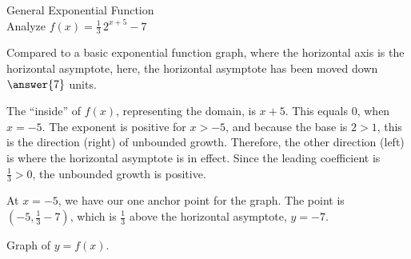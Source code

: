 \documentclass{ximera}
\begin{document}
\begin{example}  General Exponential Function \\



Analyze   $f(x) = \frac{1}{3} \, 2^{x+5} - 7$ \\


\begin{explanation}

Compared to a basic exponential function graph, where the horizontal axis is the horizontal asymptote, here, the horizontal asymptote has been moved down $\answer{7}$ units.



The ``inside'' of $f(x)$, representing the domain, is $x+5$.  This equals $0$, when $x=-5$.  The exponent is positive for $x>-5$, and because the base is $2 > 1$, this is the direction (right) of unbounded growth.  Therefore, the other direction (left) is where the horizontal asymptote is in effect.  Since the leading coefficient is $\frac{1}{3} > 0$, the unbounded growth is positive.

At $x=-5$, we have our one anchor point for the graph.  The point is $\left(-5, \frac{1}{3} - 7 \right)$, which is $\frac{1}{3}$ above the horizontal asymptote, $y = -7$.


Graph of $y = f(x)$.

\begin{image}
\end{image}
\end{explanation}
\end{example}
\end{document}
